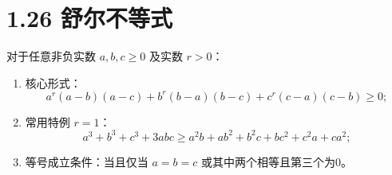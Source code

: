 \documentclass{article}
\begin{document}
\section*{1.26 舒尔不等式}
对于任意非负实数 \( a,b,c \geq 0 \) 及实数 \( r>0 \)：
\begin{enumerate}
    \item 核心形式：
    \[
    a^r(a-b)(a-c)+b^r(b-a)(b-c)+c^r(c-a)(c-b) \geq 0;
    \]
    \item 常用特例 \( r=1 \)：
    \[
    a^3+b^3+c^3+3abc \geq a^2b+ab^2+b^2c+bc^2+c^2a+ca^2;
    \]
    \item 等号成立条件：当且仅当 \( a=b=c \) 或其中两个相等且第三个为0。
\end{enumerate}
\end{document}
